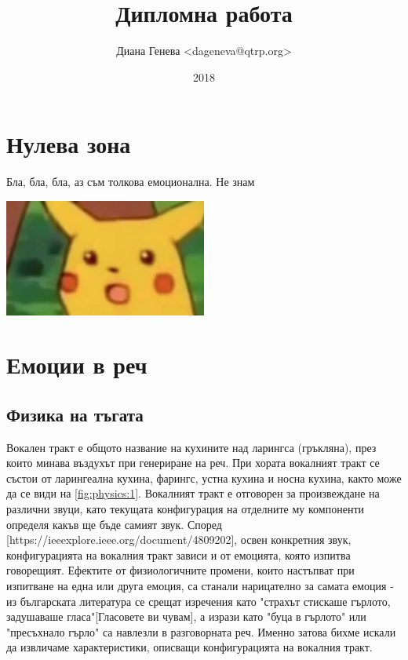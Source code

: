 \documentclass[12pt]{report}
\title{Дипломна работа}
\author{Диана Генева <dageneva@qtrp.org>}
\date{2018}
\numberwithin{equation}{section}
\numberwithin{figure}{section}
\begin{document}
\maketitle
\thispagestyle{empty}
\tableofcontents
\pagebreak

\chapter{Нулева зона}
Бла, бла, бла, аз съм толкова емоционална. 
Не знам

\includegraphics[width=0.5\textwidth ]{pikachu}
\chapter{Емоции в реч}
\label{chap:speech}

    \section{Физика на тъгата}
    Вокален тракт е общото название на кухините над ларингса (гръкляна), през които минава въздухът при генериране на реч.
    При хората вокалният тракт се състои от ларингеална кухина, фарингс, устна кухина и носна кухина, както може да се види на \autoref{fig:physics:1}.
    Вокалният тракт е отговорен за произвеждане на различни звуци, като текущата конфигурация на отделните му компоненти определя какъв ще бъде самият звук.
    Според [https://ieeexplore.ieee.org/document/4809202], освен конкретния звук, конфигурацията на вокалния тракт зависи и от емоцията, която изпитва говорещият. Ефектите от физиологичните промени,
    които настъпват при изпитване на една или друга емоция, са станали нарицателно за самата емоция - из българската литература се срещат изречения като "страхът стискаше гърлото, задушаваше гласа"[Гласовете ви чувам], а 
    изрази като "буца в гърлото" или "пресъхнало гърло" са навлезли в разговорната реч.
    Именно затова бихме искали да извличаме характеристики, описващи конфигурацията на вокалния тракт.
    
\end{document}
